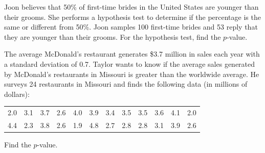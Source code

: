   

\begin{exercise}

Joon believes that 50\% of first-time brides in the United States are
younger than their grooms. She performs a hypothesis test to determine
if the percentage is the same or different from 50\%. Joon samples 100
first-time brides and 53 reply that they are younger than their grooms.
For the hypothesis test, find the \(p\)-value.

\end{exercise}
\vspace*{6\baselineskip}

\begin{exercise}

The average McDonald's restaurant generates \$3.7 million in sales each
year with a standard deviation of 0.7. Taylor wants to know if the
average sales generated by McDonald's restaurants in Missouri is greater
than the worldwide average. He surveys 24 restaurants in Missouri and
finds the following data (in millions of dollars):

\begin{tabular}{*{12}{c}}
  2.0 & 3.1 & 3.7 & 2.6 & 4.0 & 3.9 & 3.4 & 3.5 & 3.5 & 3.6 & 4.1 & 2.0 \\ 
  4.4 & 2.3 & 3.8 & 2.6 & 1.9 & 4.8 & 2.7 & 2.8 & 2.8 & 3.1 & 3.9 & 2.6  
\end{tabular}

Find the \(p\)-value.

\end{exercise}
\vspace*{6\baselineskip}

